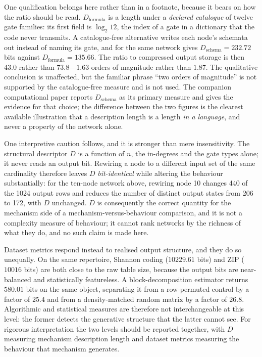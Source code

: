 \documentclass[11pt]{article}
\theoremstyle{definition}
\begin{document}
One qualification belongs here rather than in a footnote, because it bears on how the ratio should
be read. \(D_{\mathrm{formula}}\) is a length under a \emph{declared catalogue} of twelve gate
families: its first field is \(\log_2 12\), the index of a gate in a dictionary that the code never
transmits. A catalogue-free alternative writes each node's schemata out instead of naming its gate,
and for the same network gives \(D_{\mathrm{schema}} = 232.72\) bits against
\(D_{\mathrm{formula}} = 135.66\). The ratio to compressed output storage is then \(43.0\) rather
than \(73.8\)---\(1.63\) orders of magnitude rather than \(1.87\). The qualitative conclusion is
unaffected, but the familiar phrase ``two orders of magnitude'' is not supported by the
catalogue-free measure and is not used. The companion computational paper reports
\(D_{\mathrm{schema}}\) as its primary measure and gives the evidence for that choice; the
difference between the two figures is the clearest available illustration that a description length
is a length \emph{in a language}, and never a property of the network alone.

One interpretive caution follows, and it is stronger than mere insensitivity. The structural
descriptor \(D\) is a function of \(n\), the in-degrees and the gate types alone; it never reads an
output bit. Rewiring a node to a different input set of the same cardinality therefore leaves \(D\)
\emph{bit-identical} while altering the behaviour substantially: for the ten-node network above,
rewiring node 10 changes 440 of the 1024 output rows and reduces the number of distinct output
states from 206 to 172, with \(D\) unchanged. \(D\) is consequently the correct quantity for the
mechanism side of a mechanism-versus-behaviour comparison, and it is not a complexity measure of
behaviour; it cannot rank networks by the richness of what they do, and no such claim is made here.

Dataset metrics respond instead to realised output structure, and they do so unequally. On the same
repertoire, Shannon coding (\(10229.61\) bits) and ZIP (\(10016\) bits) are both close to the raw
table size, because the output bits are near-balanced and statistically featureless. A
block-decomposition estimator returns \(580.01\) bits on the same object, separating it from a
row-permuted control by a factor of \(25.4\) and from a density-matched random matrix by a factor of
\(26.8\). Algorithmic and statistical measures are therefore not interchangeable at this level: the
former detects the generative structure that the latter cannot see. For rigorous interpretation the
two levels should be reported together, with \(D\) measuring mechanism description length and
dataset metrics measuring the behaviour that mechanism generates.
\end{document}
